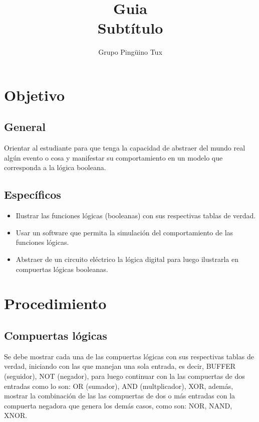 \documentclass{article}
\title{Guia\\Subtítulo}
\author{Grupo Pingüino Tux}
\begin{document}
\maketitle
%

\section{Objetivo}
\subsection{General}
Orientar al estudiante para que tenga la capacidad de abstraer del mundo
real algún evento o cosa y manifestar su comportamiento en un modelo que 
corresponda a la lógica booleana.

\subsection{Específicos}

\begin{itemize}

\item Ilustrar las funciones lógicas (booleanas) con sus respectivas
		tablas de verdad.

\item Usar un software que permita la simulación del comportamiento de
		las funciones lógicas.

\item Abstraer de un circuito eléctrico la lógica digital
para luego ilustrarla en compuertas lógicas booleanas. 

\end{itemize}

\section{Procedimiento}

\subsection{Compuertas lógicas}

Se debe mostrar cada una de las compuertas lógicas con sus respectivas
tablas de verdad, iniciando con las que manejan una sola entrada, es
decir, BUFFER (seguidor), NOT (negador), para luego continuar con la
las compuertas de dos entradas como lo son: OR (sumador), AND 
(multplicador), XOR, además, mostrar la combinación de las las compuertas 
de dos o más entradas con la compuerta negadora que genera los demás casos,
como son: NOR, NAND, XNOR.
\end{document}
